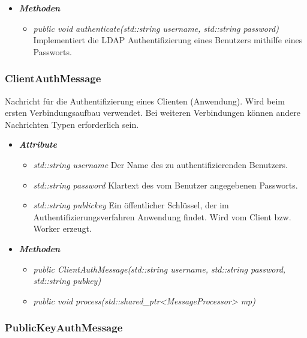 \documentclass[a4paper,12pt]{article}
\begin{document}
	\begin{itemize}[label={}]

	\item\textit{\textbf{Methoden}}
		\begin{itemize}[label={\textbullet}]
			\item\textit{public void authenticate(std::string username, std::string password)} Implementiert die LDAP Authentifizierung eines Benutzers mithilfe eines Passworts.
		\end{itemize}

\end{itemize}


\subsubsection{ClientAuthMessage}

Nachricht für die Authentifizierung eines Clienten (Anwendung). Wird beim ersten Verbindungsaufbau verwendet. Bei weiteren Verbindungen können andere Nachrichten Typen erforderlich sein.

	\begin{itemize}[label={}]

	\item\textit{\textbf{Attribute}}
		\begin{itemize}[label={\textbullet}]
			\item\textit{std::string username} Der Name des zu authentifizierenden Benutzers.
			\item\textit{std::string password} Klartext des vom Benutzer angegebenen Passworts.
			\item\textit{std::string publickey} Ein öffentlicher Schlüssel, der im Authentifizierungsverfahren Anwendung findet. Wird vom Client bzw. Worker erzeugt.
		\end{itemize}

	\item\textit{\textbf{Methoden}}
		\begin{itemize}[label={\textbullet}]
			\item\textit{public ClientAuthMessage(std::string username, std::string password, std::string pubkey)}
			\item\textit{public void process(std::shared\_ptr<MessageProcessor> mp)}
		\end{itemize}

\end{itemize}


\subsubsection{PublicKeyAuthMessage}
\end{document}
